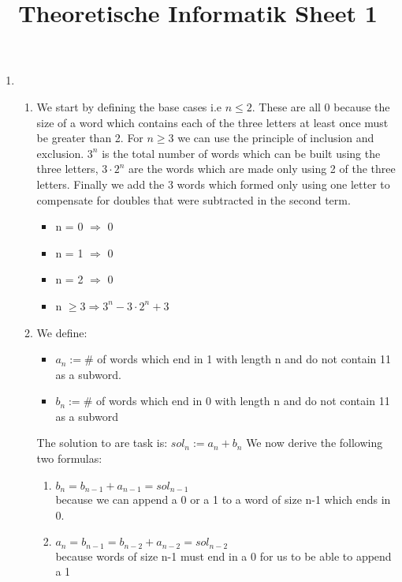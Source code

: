 \documentclass[8pt]{extreport}
\title{Theoretische Informatik Sheet 1}
\begin{document}
\begin{enumerate}
\item
\begin{enumerate}[label = \alph*)]
\item We start by defining the base cases i.e $n\leq 2$. These are all 0 because the size of a word which contains each of the three letters at least once must be greater than 2. For $n \geq 3$ we can use the principle of inclusion and exclusion. $3^n$ is the total number of words which can be built using the three letters, $3\cdot2^n$ are the words which are made only using 2 of the three letters. Finally we add the 3 words which formed only using one letter to compensate for doubles that were subtracted in the second term.
\begin{itemize}
\item n = 0 $\Rightarrow$ 0
\item n = 1 $\Rightarrow$ 0
\item n = 2 $\Rightarrow$ 0
\item n $\geq 3 \Rightarrow 3^n-3\cdot 2^n + 3$ 
\end{itemize}
\item We define:
\begin{itemize}
\item $a_n:= \#$ of words which end in 1 with length n and do not contain 11 as a subword.
\item $b_n:= \#$ of words which end in 0 with length n and do not contain 11 as a subword
\end{itemize}
The solution to are task is: $sol_n:= a_n + b_n$
We now derive the following two formulas:
\begin{enumerate}
\item $b_n = b_{n-1} + a_{n-1} = sol_{n-1}$\\ because we can append a 0 or a 1 to a word of size n-1 which ends in 0.
\item $a_n =b_{n-1} = b_{n-2}+a_{n-2} = sol_{n-2}$\\  because words of size n-1 must end in a 0 for us to be able to append a 1


\end{enumerate}
\end{enumerate}
\end{enumerate}
\end{document}

